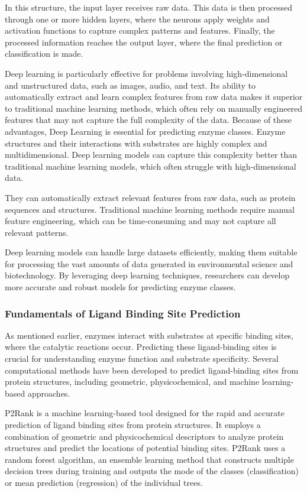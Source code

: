 In this structure, the input layer receives raw data. This data is then processed through one or more hidden layers, where the neurons apply weights and activation functions to capture complex patterns and features. Finally, the processed information reaches the output layer, where the final prediction or classification is made.

Deep learning is particularly effective for problems involving high-dimensional and unstructured data, such as images, audio, and text. Its ability to automatically extract and learn complex features from raw data makes it superior to traditional machine learning methods, which often rely on manually engineered features that may not capture the full complexity of the data. Because of these advantages, Deep Learning is essential for predicting enzyme classes. Enzyme structures and their interactions with substrates are highly complex and multidimensional. Deep learning models can capture this complexity better than traditional machine learning models, which often struggle with high-dimensional data.

They can automatically extract relevant features from raw data, such as protein sequences and structures. Traditional machine learning methods require manual feature engineering, which can be time-consuming and may not capture all relevant patterns.

Deep learning models can handle large datasets efficiently, making them suitable for processing the vast amounts of data generated in environmental science and biotechnology. By leveraging deep learning techniques, researchers can develop more accurate and robust models for predicting enzyme classes.

\subsubsection{Fundamentals of Ligand Binding Site Prediction}
\label{sec:Fundamentals of Ligand Binding Site Prediction}

As mentioned earlier, enzymes interact with substrates at specific binding sites, where the catalytic reactions occur. Predicting these ligand-binding sites is crucial for understanding enzyme function and substrate specificity. Several computational methods have been developed to predict ligand-binding sites from protein structures, including geometric, physicochemical, and machine learning-based approaches.

P2Rank is a machine learning-based tool designed for the rapid and accurate prediction of ligand binding sites from protein structures. It employs a combination of geometric and physicochemical descriptors to analyze protein structures and predict the locations of potential binding sites. P2Rank uses a random forest algorithm, an ensemble learning method that constructs multiple decision trees during training and outputs the mode of the classes (classification) or mean prediction (regression) of the individual trees.

